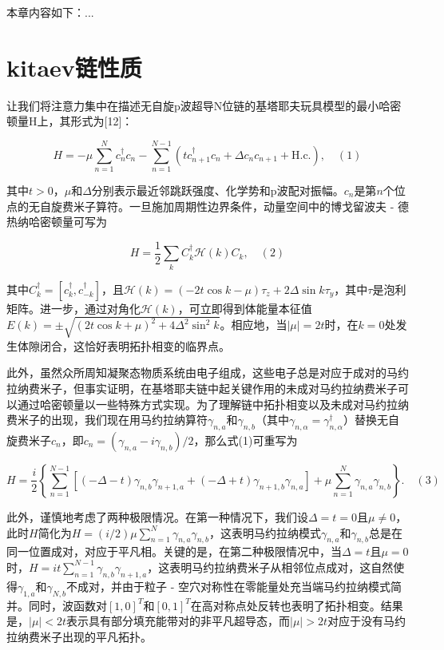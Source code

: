 本章内容如下：...

\section{kitaev链性质}

让我们将注意力集中在描述无自旋p波超导N位链的基塔耶夫玩具模型的最小哈密顿量H上，其形式为[12]：

\[H = -\mu \sum_{n = 1}^{N} c_{n}^{\dagger} c_{n} - \sum_{n = 1}^{N - 1} (t c_{n + 1}^{\dagger} c_{n} + \Delta c_{n} c_{n + 1} + \text{H.c.}), \quad (1)\]

其中\(t > 0\)，\(\mu\)和\(\Delta\)分别表示最近邻跳跃强度、化学势和p波配对振幅。\(c_{n}\)是第\(n\)个位点的无自旋费米子算符。一旦施加周期性边界条件，动量空间中的博戈留波夫 - 德热纳哈密顿量可写为

\[H = \frac{1}{2} \sum_{k} C_{k}^{\dagger} \mathcal{H}(k) C_{k}, \quad (2)\]

其中\(C_{k}^{\dagger} = [c_{k}^{\dagger}, c_{-k}^{\dagger}]\)，且\(\mathcal{H}(k) = (-2t \cos k - \mu) \tau_{z} + 2\Delta \sin k \tau_{y}\)，其中\(\tau\)是泡利矩阵。进一步，通过对角化\(\mathcal{H}(k)\)，可立即得到体能量本征值\(E(k) = \pm \sqrt{(2t \cos k + \mu)^{2} + 4\Delta^{2} \sin^{2} k}\)。相应地，当\(\vert \mu \vert = 2t\)时，在\(k = 0\)处发生体隙闭合，这恰好表明拓扑相变的临界点。

此外，虽然众所周知凝聚态物质系统由电子组成，这些电子总是对应于成对的马约拉纳费米子，但事实证明，在基塔耶夫链中起关键作用的未成对马约拉纳费米子可以通过哈密顿量以一些特殊方式实现。为了理解链中拓扑相变以及未成对马约拉纳费米子的出现，我们现在用马约拉纳算符\(\gamma_{n,a}\)和\(\gamma_{n,b}\)（其中\(\gamma_{n,\alpha} = \gamma_{n,\alpha}^{\dagger}\)）替换无自旋费米子\(c_{n}\)，即\(c_{n} = (\gamma_{n,a} - i\gamma_{n,b}) / 2\)，那么式(1)可重写为

\[H = \frac{i}{2} \left\{ \sum_{n = 1}^{N - 1} [(-\Delta - t) \gamma_{n,b} \gamma_{n + 1,a} + (-\Delta + t) \gamma_{n + 1,b} \gamma_{n,a}] + \mu \sum_{n = 1}^{N} \gamma_{n,a} \gamma_{n,b} \right\}. \quad (3)\]

此外，谨慎地考虑了两种极限情况。在第一种情况下，我们设\(\Delta = t = 0\)且\(\mu \neq 0\)，此时\(H\)简化为\(H = (i / 2) \mu \sum_{n = 1}^{N} \gamma_{n,a} \gamma_{n,b}\)，这表明马约拉纳模式\(\gamma_{n,a}\)和\(\gamma_{n,b}\)总是在同一位置成对，对应于平凡相。关键的是，在第二种极限情况中，当\(\Delta = t\)且\(\mu = 0\)时，\(H = it \sum_{n = 1}^{N - 1} \gamma_{n,b} \gamma_{n + 1,a}\)，这表明马约拉纳费米子从相邻位点成对，这自然使得\(\gamma_{1,a}\)和\(\gamma_{N,b}\)不成对，并由于粒子 - 空穴对称性在零能量处充当端马约拉纳模式简并。同时，波函数对\([1, 0]^T\)和\([0, 1]^T\)在高对称点处反转也表明了拓扑相变。结果是，\(\vert \mu \vert < 2t\)表示具有部分填充能带对的非平凡超导态，而\(\vert \mu \vert > 2t\)对应于没有马约拉纳费米子出现的平凡拓扑。

